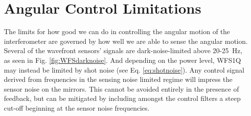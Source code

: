 \section{Angular Control Limitations}
\label{sec:ASClimits}
The limits for how good we can do in controlling the angular motion of the interferometer are governed by how well we are able to sense the angular motion. Several of the wavefront sensors' signals are dark-noise-limited above 20-25~Hz, as seen in Fig. \ref{fig:WFSdarknoise}. And depending on the power level, WFS1Q may instead be limited by shot noise (see Eq. \ref{eq:shotnoise}). Any control signal derived from frequencies in the sensing noise limited regime will impress the sensor noise on the mirrors. This cannot be avoided entirely in the presence of feedback, but can be mitigated by including amongst the control filters a steep cut-off beginning at the sensor noise frequencies. 

